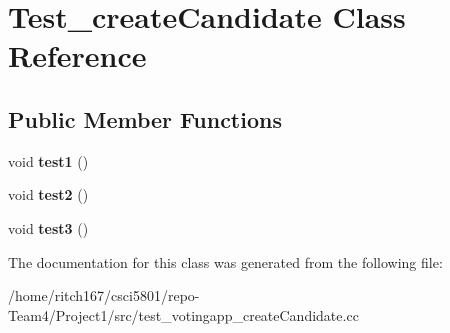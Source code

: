 \hypertarget{classTest__createCandidate}{}\section{Test\+\_\+create\+Candidate Class Reference}
\label{classTest__createCandidate}
\subsection*{Public Member Functions}
\begin{DoxyCompactItemize}
\item 
\mbox{\label{classTest__createCandidate_aaa53a5907dc715546c390dc26d6e3733}} 
void {\bfseries test1} ()
\item 
\mbox{\label{classTest__createCandidate_a55c8555fe3a0adaa597bc56370ad19d5}} 
void {\bfseries test2} ()
\item 
\mbox{\label{classTest__createCandidate_ac73c62cea9eb5a9af015f02abd3c865e}} 
void {\bfseries test3} ()
\end{DoxyCompactItemize}


The documentation for this class was generated from the following file\+:\begin{DoxyCompactItemize}
\item 
/home/ritch167/csci5801/repo-\/\+Team4/\+Project1/src/test\+\_\+votingapp\+\_\+create\+Candidate.\+cc\end{DoxyCompactItemize}
